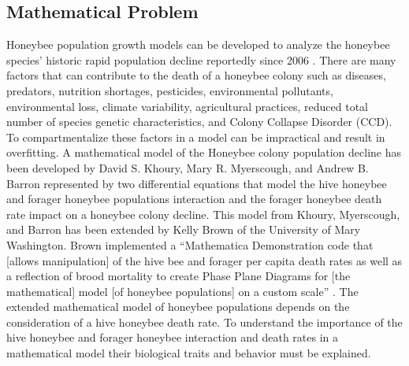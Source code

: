 \documentclass[a4paper,10pt]{article}
\begin{document}
\subsection{Mathematical Problem}
Honeybee population growth models can be developed to analyze the honeybee
species' historic rapid population decline reportedly since 2006 \cite{Nowrski}. There are
many factors that can contribute to the death of a honeybee colony such as
diseases, predators, nutrition shortages, pesticides, environmental pollutants,
environmental loss, climate variability, agricultural practices, reduced total
number of species genetic characteristics, and Colony Collapse Disorder (CCD). To
compartmentalize these factors in a model can be impractical and result in
overfitting. A mathematical model of the Honeybee colony population decline has
been developed by David S. Khoury, Mary R. Myerscough, and Andrew B. Barron \cite{Kho}
represented by two differential equations that model the hive honeybee and
forager honeybee populations interaction and the forager honeybee death rate
impact on a honeybee colony decline. This model from Khoury, Myerscough, and
Barron has been extended by Kelly Brown of the University of Mary Washington.
Brown implemented a ``Mathematica Demonstration code that [allows manipulation]
of the hive bee and forager per capita death rates as well as a reflection of
brood mortality to create Phase Plane Diagrams for [the mathematical] model [of
honeybee populations] on a custom scale'' \cite{Brown}. The extended mathematical model of
honeybee populations depends on the consideration of a hive honeybee death rate.
To understand the importance of the hive honeybee and forager honeybee
interaction and death rates in a mathematical model their biological traits and
behavior must be explained.
\end{document}
